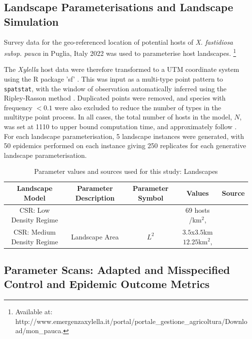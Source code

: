 \documentclass[prstpaper]{revtex4-2}
\begin{document}
\subsection{Landscape Parameterisations and Landscape Simulation}

Survey data for the geo-referenced location of potential hosts of \emph{X. fastidiosa subsp. pauca} in Puglia, Italy 2022 was  used to parameterise host landscapes. \footnote{Available at: http://www.emergenzaxylella.it/portal/portale\_gestione\_agricoltura/Download/mon\_pauca.} 

The \emph{Xylella} host data were therefore transformed to a UTM coordinate system using the R package 'sf' \cite{}. This was input as a multi-type point pattern to \texttt{spatstat}, with the window of observation automatically inferred using the Ripley-Rasson method \cite{Ripley1977}. Duplicated points were removed, and species with frequency $< 0.1$ were also excluded to reduce the number of types in the multitype point process.  
In all cases, the total number of hosts in the model, $N$, was set at 1110 to upper bound computation time, and approximately follow \cite{HyattTwynam2017}. For each landscape parameterisation, 5 landscape instances were generated, with 50 epidemics performed on each instance giving 250 replicates for each generative landscape parameterisation.

\begin{table}
    \centering
    \begin{tabular}{|c|c|c|c|c|}
    \hline
        \textbf{Landscape Model} & \textbf{Parameter Description} & \textbf{Parameter Symbol}
        & \textbf{Values} & \textbf{Source}\\
        \hline \hline
        CSR: Low Density Regime & &  & 69 hosts /km$^2$,  & \\
        \hline
        CSR: Medium Density Regime & Landscape Area & $L^{2}$ & $3.5 $x$ 3.5 $km$12.25$km$^2$,  & \\
        \hline

        \end{tabular}
    \caption{Parameter values and sources used for this study: Landscapes}
    \label{tab:my_label}
\end{table}
\subsection*{Parameter Scans: Adapted and Misspecified Control and Epidemic Outcome Metrics}
\end{document}
